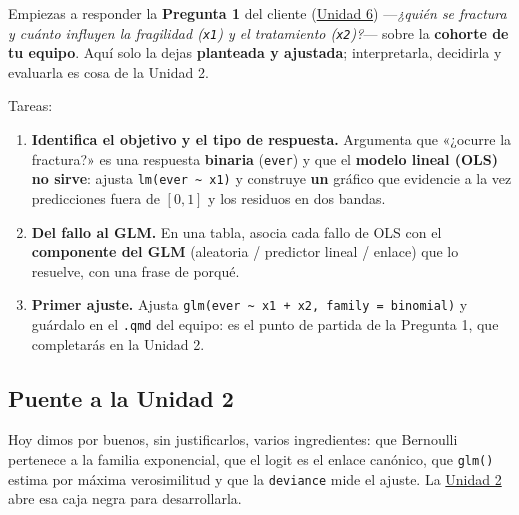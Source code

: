 \documentclass[
  letterpaper,
  DIV=11,
  numbers=noendperiod]{scrartcl}
\providecommand{\tightlist}{%
  \setlength{\itemsep}{0pt}\setlength{\parskip}{0pt}}\usepackage{longtable,booktabs,array}
\begin{document}
\begin{tcolorbox}[enhanced jigsaw, breakable, colframe=quarto-callout-important-color-frame, left=2mm, arc=.35mm, colbacktitle=quarto-callout-important-color!10!white, toprule=.15mm, colback=white, coltitle=black, rightrule=.15mm, opacitybacktitle=0.6, title=\textcolor{quarto-callout-important-color}{\faExclamation}\hspace{0.5em}{Tarea del estudiante (1.1) --- arranca la Pregunta 1 del caso}, titlerule=0mm, toptitle=1mm, bottomtitle=1mm, leftrule=.75mm, bottomrule=.15mm, opacityback=0]

Empiezas a responder la \textbf{Pregunta 1} del cliente
(\protect\hyperlink{sec-u16}{Unidad 6}) ---\emph{¿quién se fractura y
cuánto influyen la fragilidad (\texttt{x1}) y el tratamiento
(\texttt{x2})?}--- sobre la \textbf{cohorte de tu equipo}. Aquí solo la
dejas \textbf{planteada y ajustada}; interpretarla, decidirla y
evaluarla es cosa de la Unidad 2.

Tareas:

\begin{enumerate}
\def\labelenumi{\arabic{enumi}.}
\tightlist
\item
  \textbf{Identifica el objetivo y el tipo de respuesta.} Argumenta que
  «¿ocurre la fractura?» es una respuesta \textbf{binaria}
  (\texttt{ever}) y que el \textbf{modelo lineal (OLS) no sirve}: ajusta
  \texttt{lm(ever\ \textasciitilde{}\ x1)} y construye \textbf{un}
  gráfico que evidencie a la vez predicciones fuera de \([0,1]\) y los
  residuos en dos bandas.
\item
  \textbf{Del fallo al GLM.} En una tabla, asocia cada fallo de OLS con
  el \textbf{componente del GLM} (aleatoria / predictor lineal / enlace)
  que lo resuelve, con una frase de porqué.
\item
  \textbf{Primer ajuste.} Ajusta
  \texttt{glm(ever\ \textasciitilde{}\ x1\ +\ x2,\ family\ =\ binomial)}
  y guárdalo en el \texttt{.qmd} del equipo: es el punto de partida de
  la Pregunta 1, que completarás en la Unidad 2.
\end{enumerate}

\end{tcolorbox}

\hypertarget{sec-u11-puente}{%
\subsection{Puente a la Unidad 2}\label{sec-u11-puente}}

Hoy dimos por buenos, sin justificarlos, varios ingredientes: que
Bernoulli pertenece a la familia exponencial, que el logit es el enlace
canónico, que \texttt{glm()} estima por máxima verosimilitud y que la
\texttt{deviance} mide el ajuste. La \protect\hyperlink{sec-u12}{Unidad
2} abre esa caja negra para desarrollarla.
\end{document}

